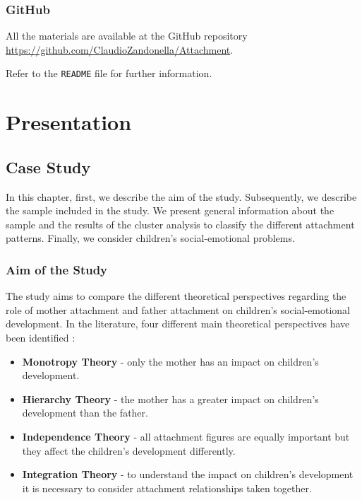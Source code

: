 \documentclass[
]{book}
\providecommand{\tightlist}{%
  \setlength{\itemsep}{0pt}\setlength{\parskip}{0pt}}
\begin{document}
\hypertarget{github}{%
\section*{GitHub}\label{github}}

All the materials are available at the GitHub repository \url{https://github.com/ClaudioZandonella/Attachment}.

Refer to the \texttt{README} file for further information.

\hypertarget{part-presentation}{%
\part*{Presentation}\label{part-presentation}}

\hypertarget{case-study}{%
\chapter{Case Study}\label{case-study}}

In this chapter, first, we describe the aim of the study. Subsequently, we describe the sample included in the study. We present general information about the sample and the results of the cluster analysis to classify the different attachment patterns. Finally, we consider children's social-emotional problems.

\hypertarget{aim-of-the-study}{%
\section{Aim of the Study}\label{aim-of-the-study}}

The study aims to compare the different theoretical perspectives regarding the role of mother attachment and father attachment on children's social-emotional development. In the literature, four different main theoretical perspectives have been identified \citep{brethertonFathersAttachmentTheory2010}:

\begin{itemize}
\tightlist
\item
  \textbf{Monotropy Theory} - only the mother has an impact on children's development.
\item
  \textbf{Hierarchy Theory} - the mother has a greater impact on children's development than the father.
\item
  \textbf{Independence Theory} - all attachment figures are equally important but they affect the children's development differently.
\item
  \textbf{Integration Theory} - to understand the impact on children's development it is necessary to consider attachment relationships taken together.
\end{itemize}
\end{document}
